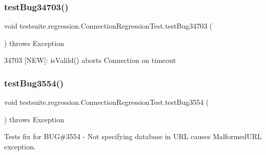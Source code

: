 \subsubsection{\texorpdfstring{test\+Bug34703()}{testBug34703()}}
{\footnotesize\ttfamily void testsuite.\+regression.\+Connection\+Regression\+Test.\+test\+Bug34703 (\begin{DoxyParamCaption}{ }\end{DoxyParamCaption}) throws Exception}

34703 \mbox{[}N\+EW\mbox{]}\+: is\+Valild() aborts Connection on timeout \mbox{\label{classtestsuite_1_1regression_1_1_connection_regression_test_a37a5b68fc2ee7b632c08744bc7579f29}} 
\subsubsection{\texorpdfstring{test\+Bug3554()}{testBug3554()}}
{\footnotesize\ttfamily void testsuite.\+regression.\+Connection\+Regression\+Test.\+test\+Bug3554 (\begin{DoxyParamCaption}{ }\end{DoxyParamCaption}) throws Exception}

Tests fix for B\+UG\#3554 -\/ Not specifying database in U\+RL causes Malformed\+U\+RL exception.


